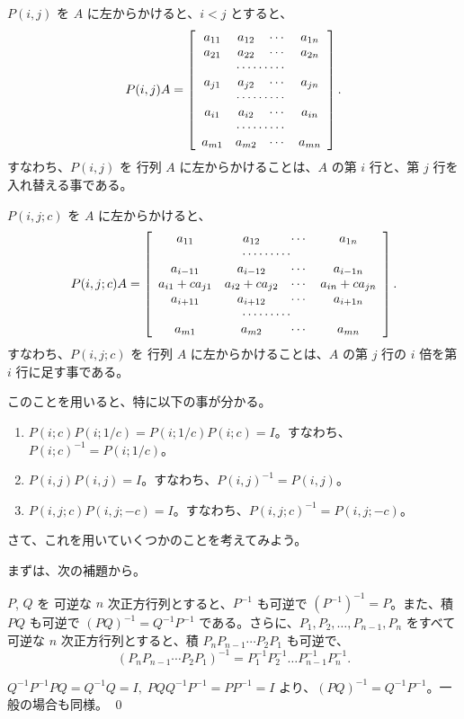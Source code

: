 \smallskip
$P(i,j)$ を $A$ に左からかけると、$i<j$ とすると、
$$P(i,j)A = \left[\begin{array}{cccc}a_{11} & a_{12} & \cdots & a_{1n} \\
a_{21} & a_{22} & \cdots & a_{2n}\\
\multicolumn{4}{c}{\cdots\cdots\cdots}\\
a_{j1} & a_{j2} & \cdots & a_{jn}\\
\multicolumn{4}{c}{\cdots\cdots\cdots}\\
a_{i1} & a_{i2} & \cdots & a_{in}\\
\multicolumn{4}{c}{\cdots\cdots\cdots}\\
a_{m1} & a_{m2} & \cdots & a_{mn}
\end{array}\right].$$
すなわち、$P(i,j)$ を 行列 $A$ に左からかけることは、$A$ の第 $i$ 行と、第 $j$ 行を入れ替える事である。

\smallskip
$P(i,j;c)$ を $A$ に左からかけると、
$$P(i,j;c)A = \left[\begin{array}{cccc}a_{11} & a_{12} & \cdots & a_{1n} \\
\multicolumn{4}{c}{\cdots\cdots\cdots}\\
a_{i-11} & a_{i-12} & \cdots & a_{i-1n}\\
a_{i1}+ca_{j1} & a_{i2}+ca_{j2} & \cdots & a_{in}+ca_{jn}\\
a_{i+11} & a_{i+12} & \cdots & a_{i+1n}\\
\multicolumn{4}{c}{\cdots\cdots\cdots}\\
a_{m1} & a_{m2} & \cdots & a_{mn}
\end{array}\right].$$
すなわち、$P(i,j;c)$ を 行列 $A$ に左からかけることは、$A$ の第 $j$ 行の $i$ 倍を第 $i$ 行に足す事である。

\medskip
このことを用いると、特に以下の事が分かる。
\begin{enumerate}
\item $P(i;c)P(i;1/c) = P(i;1/c)P(i;c) = I$。すなわち、$P(i;c)^{-1} = P(i;1/c)$。
\item $P(i,j)P(i,j) = I$。すなわち、$P(i,j)^{-1} = P(i,j)$。
\item $P(i,j;c)P(i,j;-c) = I$。すなわち、$P(i,j;c)^{-1} = P(i,j;-c)$。
\end{enumerate}

\bigskip
さて、これを用いていくつかのことを考えてみよう。

まずは、次の補題から。

\begin{lemma} \label{lemma:inverse}
$P$, $Q$ を 可逆な $n$ 次正方行列とすると、$P^{-1}$ も可逆で $(P^{-1})^{-1} = P$。また、積 $PQ$ も可逆で $(PQ)^{-1} = Q^{-1}P^{-1}$ である。さらに、$P_1, P_2, \ldots, P_{n-1}, P_n$ をすべて可逆な $n$ 次正方行列とすると、積 $P_nP_{n-1}\cdots P_2P_1$ も可逆で、
$$(P_nP_{n-1}\cdots P_2P_1)^{-1} = P_1^{-1}P_2^{-1}\ldots P_{n-1}^{-1}P_n^{-1}.$$
\end{lemma}
\proof
$Q^{-1}P^{-1}PQ = Q^{-1}Q = I,\;PQQ^{-1}P^{-1} = PP^{-1} = I$ より、$(PQ)^{-1} = Q^{-1}P^{-1}$。一般の場合も同様。
\qed

